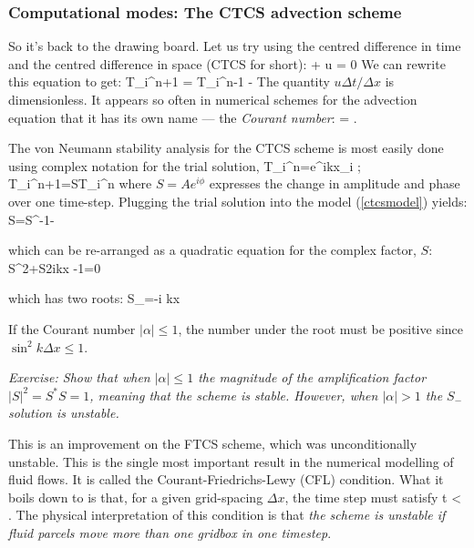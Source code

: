 \subsubsection{Computational modes: The CTCS advection scheme}

So it's back to the drawing board. Let us try using the centred difference in time and the
centred difference in space (CTCS for short):
\BEQ {} + u  = 0 \EEQ
We can rewrite this equation to get:
\BEQ T_{i}^{n+1} = T_{i}^{n-1} -  \left[ T_{i+1}^{n} - T_{i-1}^{n} \right] \label{ctcsmodel} \EEQ
The quantity $u\Delta t / \Delta x$ is dimensionless.  It appears so often in
numerical schemes for the advection equation that it has its own name --- the
\emph{Courant number}:
\BEQ \alpha =  .\EEQ

The von Neumann stability analysis for the CTCS scheme is most easily
done using complex notation for the trial solution, 
\BEQ T_i^n=e^{ikx_i}\;\; ; \;\;\;\; T_i^{n+1}=ST_i^n \EEQ
where $S=Ae^{i\phi}$ expresses 
the change in amplitude and phase over one time-step.
Plugging the trial solution into the model (\ref{ctcsmodel}) yields:
\BEQ
S=S^{-1}-\alpha{}
\EEQ 

which can be re-arranged as a quadratic equation
for the complex factor, $S$: 
\BEQ
S^2+S\alpha 2i\sin k\Delta x -1=0
\EEQ

which has two roots:
\BEQ
S_{\pm}=-i \alpha \sin k\Delta x\pm {}
\label{asoln}
\EEQ

If the Courant number $|\alpha | \le 1$, the number under the root must
be positive since $\sin^2 k\Delta x \le 1$. 

{\em Exercise: Show that when $|\alpha | \le 1$ the magnitude of the
	amplification factor $|S|^2=S^* S=1$, meaning that the scheme is
	stable. However, when $|\alpha | > 1$ the $S_{-}$ solution is
	unstable.}

This is an improvement on the FTCS scheme, which was unconditionally
unstable. This is the single most important result in the numerical
modelling of fluid flows.  It is called the Courant-Friedrichs-Lewy
(CFL) condition.  What it boils down to is that, for a given
grid-spacing $\Delta x$, the time step must satisfy \BEQ \Delta t <
 . \EEQ The physical interpretation of this condition
is that \emph{the scheme is unstable if fluid parcels move more than
	one gridbox in one timestep}.

